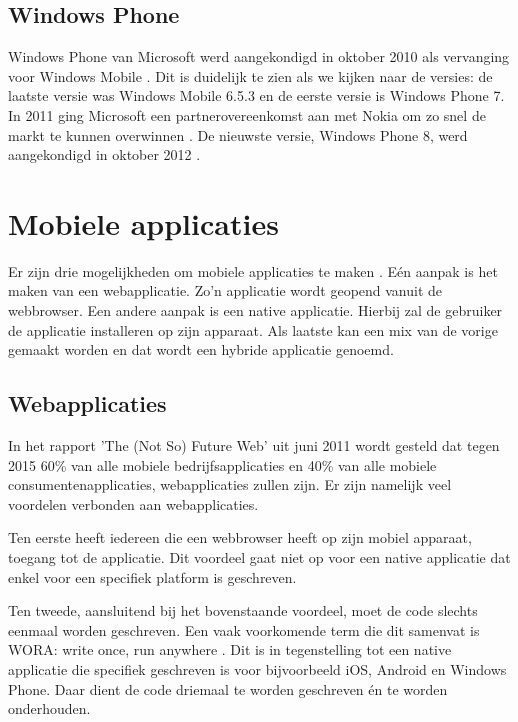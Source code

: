 \subsection{Windows Phone}
Windows Phone van Microsoft werd aangekondigd in oktober 2010 als vervanging voor Windows Mobile \cite{Seitz2010,Lieberman2010}. Dit is duidelijk te zien als we kijken naar de versies: de laatste versie was Windows Mobile 6.5.3 en de eerste versie is Windows Phone 7. In 2011 ging Microsoft een partnerovereenkomst aan met Nokia om zo snel de markt te kunnen overwinnen \cite{Microsoft2011}. De nieuwste versie, Windows Phone 8, werd aangekondigd in oktober 2012 \cite{Reed2012}. 


\section{Mobiele applicaties}
\label{sec:mobiele-applicaties}
Er zijn drie mogelijkheden om mobiele applicaties te maken \cite{Accenture2012,Hales2012}. Eén aanpak is het maken van een webapplicatie. Zo'n applicatie wordt geopend vanuit de webbrowser. Een andere aanpak is een native applicatie. Hierbij zal de gebruiker de applicatie installeren op zijn apparaat. Als laatste kan een mix van de vorige gemaakt worden en dat wordt een hybride applicatie genoemd.

\subsection{Webapplicaties}
In het rapport 'The (Not So) Future Web' \cite{Phifer2011} uit juni 2011 wordt gesteld dat tegen 2015 60\% van alle mobiele bedrijfsapplicaties en 40\% van alle mobiele consumentenapplicaties, webapplicaties zullen zijn. Er zijn namelijk veel voordelen \cite{Accenture2012} verbonden aan webapplicaties.

Ten eerste heeft iedereen die een webbrowser heeft op zijn mobiel apparaat, toegang tot de applicatie.  Dit voordeel gaat niet op voor een native applicatie dat enkel voor een specifiek platform is geschreven. 

Ten tweede, aansluitend bij het bovenstaande voordeel, moet de code slechts eenmaal worden geschreven. Een vaak voorkomende term die dit samenvat is WORA: write once, run anywhere \cite{Hales2012}. Dit is in tegenstelling tot een native applicatie die specifiek geschreven is voor bijvoorbeeld iOS, Android en Windows Phone. Daar dient de code driemaal te worden geschreven \'en te worden onderhouden.

